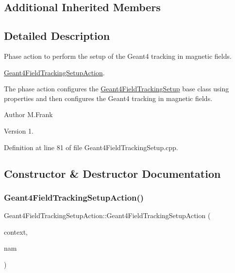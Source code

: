 \subsection*{Additional Inherited Members}


\subsection{Detailed Description}
Phase action to perform the setup of the Geant4 tracking in magnetic fields. 

\hyperlink{class_d_d4hep_1_1_simulation_1_1_geant4_field_tracking_setup_action}{Geant4\+Field\+Tracking\+Setup\+Action}.

The phase action configures the \hyperlink{struct_d_d4hep_1_1_simulation_1_1_geant4_field_tracking_setup}{Geant4\+Field\+Tracking\+Setup} base class using properties and then configures the Geant4 tracking in magnetic fields.

\begin{DoxyAuthor}{Author}
M.\+Frank 
\end{DoxyAuthor}
\begin{DoxyVersion}{Version}
1. 
\end{DoxyVersion}


Definition at line 81 of file Geant4\+Field\+Tracking\+Setup.\+cpp.



\subsection{Constructor \& Destructor Documentation}
\hypertarget{class_d_d4hep_1_1_simulation_1_1_geant4_field_tracking_setup_action_a921208adb94ef397bd208a75a8654dcc}{}\label{class_d_d4hep_1_1_simulation_1_1_geant4_field_tracking_setup_action_a921208adb94ef397bd208a75a8654dcc} 
\subsubsection{\texorpdfstring{Geant4\+Field\+Tracking\+Setup\+Action()}{Geant4FieldTrackingSetupAction()}}
{\footnotesize\ttfamily Geant4\+Field\+Tracking\+Setup\+Action\+::\+Geant4\+Field\+Tracking\+Setup\+Action (\begin{DoxyParamCaption}\item[{\hyperlink{class_d_d4hep_1_1_simulation_1_1_geant4_context}{Geant4\+Context} $\ast$}]{context,  }\item[{const std\+::string \&}]{nam }\end{DoxyParamCaption})}



